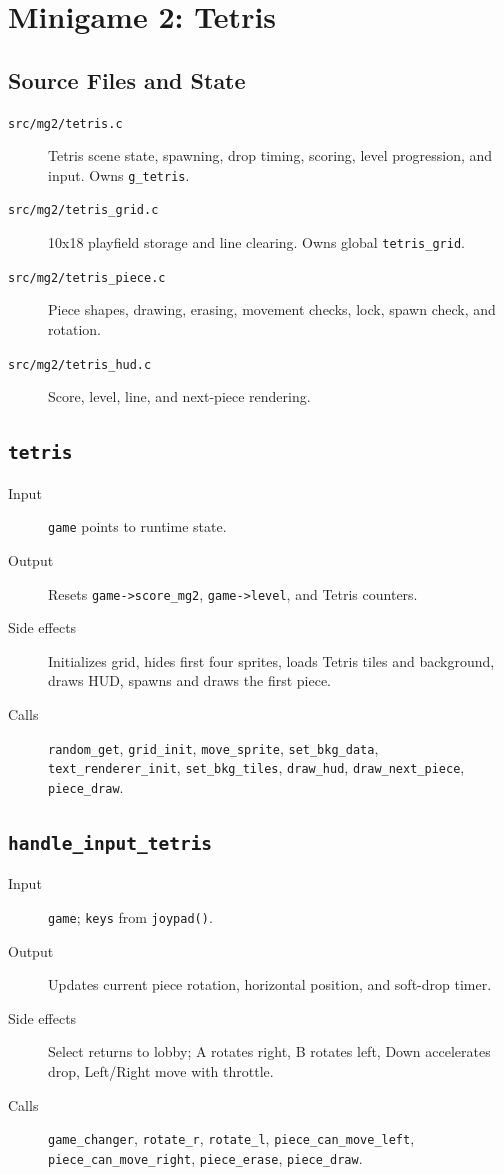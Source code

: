 \section{Minigame 2: Tetris}

\subsection{Source Files and State}

\begin{description}
  \item[\texttt{src/mg2/tetris.c}] Tetris scene state, spawning, drop timing, scoring, level progression, and input. Owns \texttt{g\_tetris}.
  \item[\texttt{src/mg2/tetris\_grid.c}] 10x18 playfield storage and line clearing. Owns global \texttt{tetris\_grid}.
  \item[\texttt{src/mg2/tetris\_piece.c}] Piece shapes, drawing, erasing, movement checks, lock, spawn check, and rotation.
  \item[\texttt{src/mg2/tetris\_hud.c}] Score, level, line, and next-piece rendering.
\end{description}

\subsection*{\texttt{tetris}}
\begin{description}
  \item[Input] \texttt{game} points to runtime state.
  \item[Output] Resets \texttt{game->score\_mg2}, \texttt{game->level}, and Tetris counters.
  \item[Side effects] Initializes grid, hides first four sprites, loads Tetris tiles and background, draws HUD, spawns and draws the first piece.
  \item[Calls] \texttt{random\_get}, \texttt{grid\_init}, \texttt{move\_sprite}, \texttt{set\_bkg\_data}, \texttt{text\_renderer\_init}, \texttt{set\_bkg\_tiles}, \texttt{draw\_hud}, \texttt{draw\_next\_piece}, \texttt{piece\_draw}.
\end{description}

\subsection*{\texttt{handle\_input\_tetris}}
\begin{description}
  \item[Input] \texttt{game}; \texttt{keys} from \texttt{joypad()}.
  \item[Output] Updates current piece rotation, horizontal position, and soft-drop timer.
  \item[Side effects] Select returns to lobby; A rotates right, B rotates left, Down accelerates drop, Left/Right move with throttle.
  \item[Calls] \texttt{game\_changer}, \texttt{rotate\_r}, \texttt{rotate\_l}, \texttt{piece\_can\_move\_left}, \texttt{piece\_can\_move\_right}, \texttt{piece\_erase}, \texttt{piece\_draw}.
\end{description}

